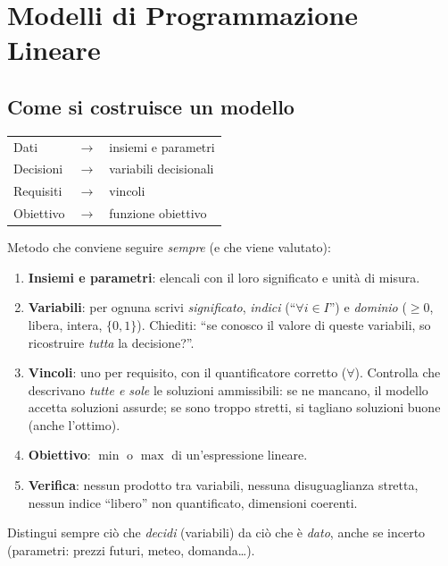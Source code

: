 \chapter{Modelli di Programmazione Lineare}\label{cap:mod}

\section{Come si costruisce un modello}

\begin{center}
\begin{tabular}{@{}lcl@{}}
\toprule
Dati & $\longrightarrow$ & insiemi e parametri\\
Decisioni & $\longrightarrow$ & variabili decisionali\\
Requisiti & $\longrightarrow$ & vincoli\\
Obiettivo & $\longrightarrow$ & funzione obiettivo\\
\bottomrule
\end{tabular}
\end{center}

\begin{esame}
Metodo che conviene seguire \emph{sempre} (e che viene valutato):
\begin{enumerate}[nosep]
\item \textbf{Insiemi e parametri}: elencali con il loro significato e unità di misura.
\item \textbf{Variabili}: per ognuna scrivi \emph{significato}, \emph{indici} (``$\forall i\in I$'') e \emph{dominio} ($\ge0$, libera, intera, $\{0,1\}$). Chiediti: ``se conosco il valore di queste variabili, so ricostruire \emph{tutta} la decisione?''.
\item \textbf{Vincoli}: uno per requisito, con il quantificatore corretto ($\forall$). Controlla che descrivano \emph{tutte e sole} le soluzioni ammissibili: se ne mancano, il modello accetta soluzioni assurde; se sono troppo stretti, si tagliano soluzioni buone (anche l'ottimo).
\item \textbf{Obiettivo}: $\min$ o $\max$ di un'espressione lineare.
\item \textbf{Verifica}: nessun prodotto tra variabili, nessuna disuguaglianza stretta, nessun indice ``libero'' non quantificato, dimensioni coerenti.
\end{enumerate}
Distingui sempre ciò che \emph{decidi} (variabili) da ciò che è \emph{dato}, anche se incerto (parametri: prezzi futuri, meteo, domanda\ldots).
\end{esame}

